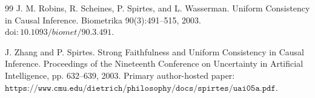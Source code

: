 \documentclass{article}
\begin{document}
\begin{thebibliography}{99}
   J. M. Robins, R. Scheines, P. Spirtes, and L. Wasserman. Uniform Consistency in Causal Inference. Biometrika 90(3):491--515, 2003. \(\mathrm{doi}:10.1093/biomet/90.3.491\).

   J. Zhang and P. Spirtes. Strong Faithfulness and Uniform Consistency in Causal Inference. Proceedings of the Nineteenth Conference on Uncertainty in Artificial Intelligence, pp. 632--639, 2003. Primary author-hosted paper: \(\texttt{https://www.cmu.edu/dietrich/philosophy/docs/spirtes/uai05a.pdf}\).

\end{thebibliography}
\end{document}
